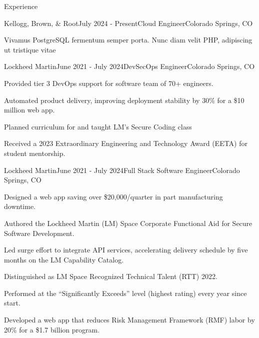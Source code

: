 \documentclass[
	11pt, %
]{resume} %
\begin{document}

\begin{rSection}{Experience}

	\begin{rSubsection}{Kellogg, Brown, \& Root}{July 2024 - Present}{Cloud Engineer}{Colorado Springs, CO}
		\item Vivamus PostgreSQL fermentum semper porta. Nunc diam velit PHP, adipiscing ut tristique vitae
	\end{rSubsection}


	\begin{rSubsection}{Lockheed Martin}{June 2021 - July 2024}{DevSecOps Engineer}{Colorado Springs, CO}
		\item Provided tier 3 DevOps support for software team of 70+ engineers.
		\item Automated product delivery, improving deployment stability by 30\% for a \$10 million web app.
		\item Planned curriculum for and taught LM’s Secure Coding class
		\item Received a 2023 Extraordinary Engineering and Technology Award (EETA) for student mentorship.
	\end{rSubsection}


	\begin{rSubsection}{Lockheed Martin}{June 2021 - July 2024}{Full Stack Software Engineer}{Colorado Springs, CO}
		\item Designed a web app saving over \$20,000/quarter in part manufacturing downtime.
		\item Authored the Lockheed Martin (LM) Space Corporate Functional Aid for Secure Software Development.
		\item Led surge effort to integrate API services, accelerating delivery schedule by five months on the LM Capability Catalog.
		\item Distinguished as LM Space Recognized Technical Talent (RTT) 2022.
		\item Performed at the “Significantly Exceeds” level (highest rating) every year since start.
		\item Developed a web app that reduces Risk Management Framework (RMF) labor by 20\% for a \$1.7 billion program.
	\end{rSubsection}


\end{rSection}
\end{document}
